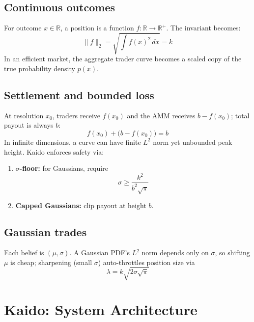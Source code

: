 \documentclass{portalciencia}
\begin{document}
\subsection{Continuous outcomes}

For outcome $x \in \mathbb{R}$, a position is a function $f: \mathbb{R} \to \mathbb{R}^+$. The invariant becomes:
\begin{equation}
\label{eq:continuous-invariant}
\|f\|_2 = \sqrt{\int f(x)^2 \, dx} = k
\end{equation}
In an efficient market, the aggregate trader curve becomes a scaled copy of the true probability density $p(x)$.

\subsection{Settlement and bounded loss}

At resolution $x_0$, traders receive $f(x_0)$ and the AMM receives $b - f(x_0)$; total payout is always $b$:
\begin{equation}
\label{eq:settlement}
f(x_0) + \bigl(b - f(x_0)\bigr) = b
\end{equation}
In infinite dimensions, a curve can have finite $L^2$ norm yet unbounded peak height. Kaido enforces safety via:
\begin{enumerate}
  \item \textbf{$\sigma$-floor:} for Gaussians, require
  \begin{equation}
  \label{eq:sigma-floor}
  \sigma \geq \frac{k^2}{b^2\sqrt{\pi}}
  \end{equation}
  \item \textbf{Capped Gaussians:} clip payout at height $b$.
\end{enumerate}

\subsection{Gaussian trades}

Each belief is $(\mu, \sigma)$. A Gaussian PDF's $L^2$ norm depends only on $\sigma$, so shifting $\mu$ is cheap; sharpening (small $\sigma$) auto-throttles position size via
\begin{equation}
\label{eq:lambda-scaling}
\lambda = k\sqrt{2\sigma\sqrt{\pi}}
\end{equation}

\section{Kaido: System Architecture}
\end{document}
